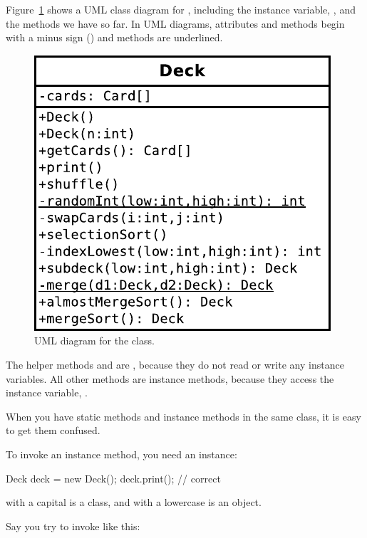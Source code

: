 Figure~\ref{fig.deck} shows a UML class diagram for , including the instance variable, , and the methods we have so far.
In UML diagrams,  attributes and methods begin with a minus sign (\java{-}) and  methods are underlined.


\begin{figure}[!ht]
\begin{center}
\includegraphics{figs/deck.pdf}
\caption{UML diagram for the  class.}
\label{fig.deck}
\end{center}
\end{figure}

The helper methods  and  are , because they do not read or write any instance variables.
All other methods are instance methods, because they access the instance variable, .

When you have static methods and instance methods in the same class, it is easy to get them confused.

To invoke an instance method, you need an instance:

\begin{code}
Deck deck = new Deck();
deck.print();  // correct
\end{code}

 with a capital  is a class, and  with a lowercase  is an object.

Say you try to invoke  like this:

